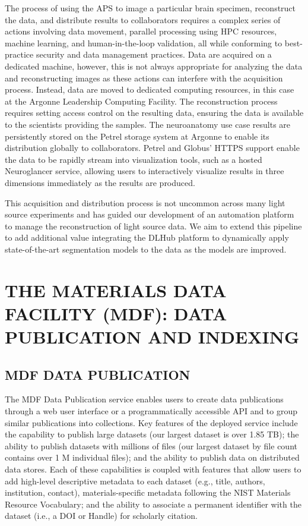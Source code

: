 \documentclass{aip-cp}
\newcommand\ben[1]{}
\newcommand\ben[1]{{\color{blue}[Ben: #1]}}
\begin{document}
The process of using the APS to image a particular brain specimen, reconstruct the data, and 
distribute 
results to collaborators requires a complex series of actions involving data movement, 
parallel processing using HPC resources, machine learning, and human-in-the-loop validation, all 
while conforming to best-practice security and data management practices. Data are acquired on a 
dedicated machine, however, this is not always appropriate for analyzing the data and 
reconstructing images as these actions can interfere with the acquisition process. Instead, data 
are moved to dedicated computing resources, in this case at the Argonne Leadership Computing 
Facility. The 
reconstruction process requires setting access control on the resulting data, 
ensuring the data is available to the scientists providing the samples. The neuroanatomy use 
case results are persistently stored on the Petrel storage system at Argonne to enable its 
distribution globally to collaborators. Petrel and Globus' HTTPS support enable the data to be 
rapidly stream into visualization tools, such as a hosted Neuroglancer service, 
allowing users to interactively visualize results in three dimensions 
immediately as the results are produced. 

This acquisition and distribution process is not uncommon across many light source 
experiments and has guided our development of an automation platform to manage the reconstruction of 
light source data. We aim to extend this pipeline to add 
additional value integrating the DLHub platform to dynamically apply state-of-the-art 
segmentation models to the data as the models are improved.

\section{THE MATERIALS DATA FACILITY (MDF): DATA PUBLICATION AND INDEXING}

\ben{Add MDF overview text and text linking this to the other sections}

\subsection{MDF DATA PUBLICATION} 
The MDF Data Publication service enables
users to create data publications through a web user interface or a
programmatically accessible API and to group similar publications into
collections. Key features of the deployed service include the capability to
publish large datasets (our largest dataset is over 1.85 TB); the ability to
publish datasets with millions of files (our largest dataset by file count
contains over 1 M individual files); and the ability to publish data on
distributed data stores. Each of these capabilities is coupled with
features that allow users to add high-level descriptive metadata to each dataset
(e.g., title, authors, institution, contact), materials-specific metadata
following the NIST Materials Resource Vocabulary; and the ability to associate
a permanent identifier with the dataset (i.e., a DOI or Handle) for scholarly
citation.
\end{document}
